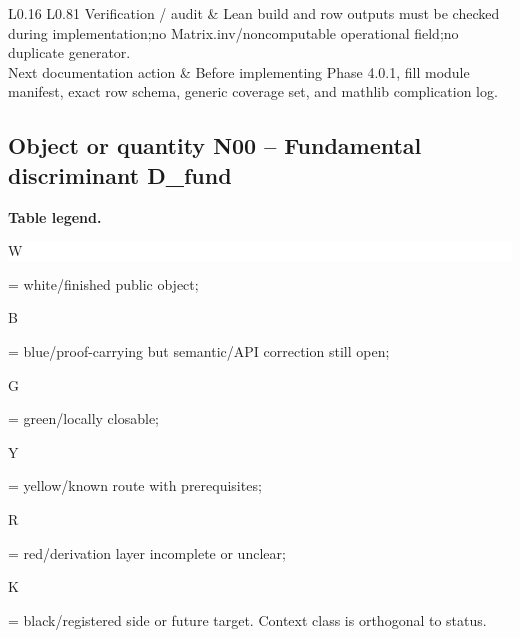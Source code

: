 \begin{longtable}{L{0.16\linewidth} L{0.81\linewidth}}
\hline\addlinespace[0.20em]
Verification /\allowbreak{} audit & Lean build and row outputs must be checked during implementation;\newline no Matrix.inv/\allowbreak{}noncomputable operational field;\newline no duplicate generator.\\
\hline\addlinespace[0.20em]
Next documentation action & Before implementing Phase 4.0.1, fill module manifest, exact row schema, generic coverage set, and mathlib complication log.\\
\hline\addlinespace[0.20em]
\end{longtable}
\subsection*{Object or quantity N00 -- Fundamental discriminant D\_fund}
\hypertarget{objproof:N00}{}
\par\smallskip\noindent\begin{minipage}{0.99\linewidth}\footnotesize\raggedright\textbf{Table legend.} \colorbox{white}{\strut W} = white/finished public object; \colorbox{cyan!20}{\strut B} = blue/proof-carrying but semantic/API correction still open; \colorbox{green!18}{\strut G} = green/locally closable; \colorbox{yellow!25}{\strut Y} = yellow/known route with prerequisites; \colorbox{red!20}{\strut R} = red/derivation layer incomplete or unclear; \colorbox{black!18}{\strut K} = black/registered side or future target. Context class is orthogonal to status.\end{minipage}\par\vspace{0.25em}
